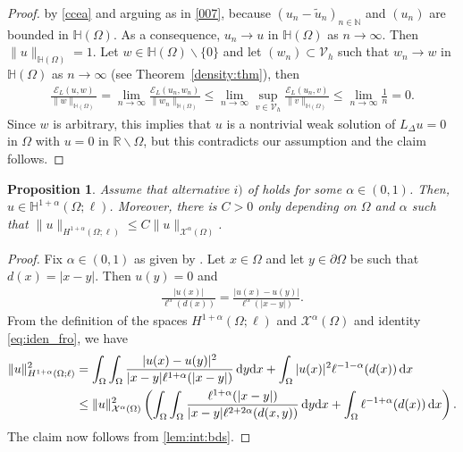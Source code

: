 \documentclass[10 pt]{article}
\newtheorem{proposition}[theorem]{Proposition}
\numberwithin{equation}{section}
\def\N{\mathbb{N}}
\def\R{\mathbb{R}}
\def\cE{\mathcal{E}}
\def\d{\textnormal{d}}
\begin{document}
\begin{proof}
by \eqref{ccea} and arguing as in \eqref{007}, because $(u_n-\widetilde u_n)_{n\in\N}$ and $(u_n)$ are bounded in $\mathbb H(\Omega)$.  As a consequence, $u_n\to u$ in $\mathbb H(\Omega)$ as $n\to\infty$. Then $\|u\|_{\mathbb H(\Omega)}=1$. Let $w\in \mathbb H(\Omega)\backslash \{0\}$ and let $(w_n)\subset \mathcal V_h$ such that $w_n\to w$ in $\mathbb H(\Omega)$ as $n\to \infty$ (see Theorem~\ref{density:thm}), then
\begin{align*}
    \frac{\cE_{L}(u,w)}{\|w\|_{\mathbb H(\Omega)}}=\lim_{n\to\infty}\frac{\cE_{L}(u_n,w_n)}{\|w_n\|_{\mathbb H(\Omega)}}\leq \lim_{n\to\infty}\sup_{v\in \mathcal V_h}\frac{\cE_{L}(u_n,v)}{\|v\|_{\mathbb H(\Omega)}}\leq \lim_{n\to\infty}\frac{1}{n}=0.
\end{align*}
Since $w$ is arbitrary, this implies that $u$ is a nontrivial weak solution of $L_\Delta u=0$ in $\Omega$ with $u=0$ in $\R\backslash  \Omega$, but this contradicts our assumption and the claim follows. 
\end{proof}


\begin{proposition}\label{prop:more_regularity}
Assume that alternative $i)$ of  holds for some $\alpha\in(0,1)$. Then, $u\in \mathbb H^{1+\alpha}(\Omega;\ell)$. Moreover, there is $C>0$ only depending on $\Omega$ and $\alpha$ such that $\|u\|_{H^{1+\alpha}(\Omega;\ell)}\leq C\|u\|_{\mathcal X^{\alpha}(\Omega)}$.
\end{proposition}
%
\begin{proof}
Fix $\alpha\in(0,1)$ as given by . Let $x\in \Omega$ and let $y\in\partial \Omega$ be such that $d(x)=|x-y|$. Then $u(y)=0$ and 
%
\begin{align}\label{eq:iden_fro}
    \frac{|u(x)|}{\ell^{\alpha}(d(x))}=\frac{|u(x)-u(y)|}{\ell^{\alpha}(|x-y|)}.
\end{align}
%
From the definition of the spaces $H^{1+\alpha}(\Omega;\ell)$ and $\mathcal X^\alpha(\Omega)$ and identity \eqref{eq:iden_fro}, we have
%
\begin{align*}\notag
    \|u\|^2_{H^{1+\alpha}(\Omega;\ell)}&=\int_{\Omega}\int_{\Omega}\frac{|u(x)-u(y)|^2}{|x-y|\ell^{1+\alpha}(|x-y|)}\, \d{y} \d{x}+\int_{\Omega}|u(x)|^2\ell^{-1-\alpha}(d(x))\,\d{x} \\
    &\leq \|u\|^2_{\mathcal X^{\alpha}(\Omega)}\left(\int_{\Omega}\int_{\Omega}\frac{\ell^{1+\alpha}(|x-y|)}{|x-y|\ell^{2+2\alpha}(d(x,y))}\,\d{y}\d{x}+ \int_{\Omega}\ell^{-1+\alpha}(d(x))\,\d{x}\right). %
\end{align*}
%
The claim now follows from \eqref{lem:int:bds}.
\end{proof}
%
\end{document}
